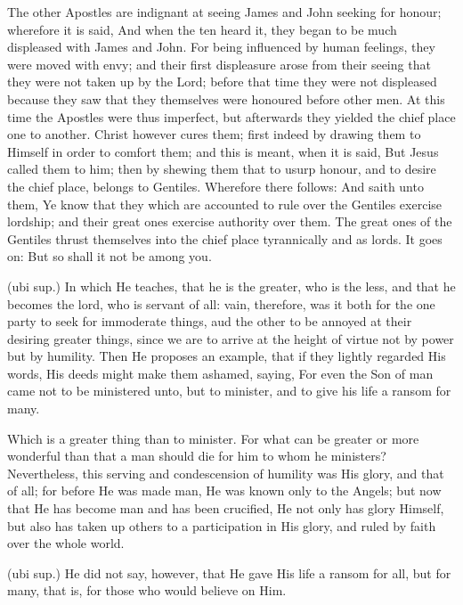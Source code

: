  The other Apostles are indignant at seeing James and John seeking for honour; wherefore it is said, And when the ten heard it, they began to be much displeased with James and John. For being influenced by human feelings, they were moved with envy; and their first displeasure arose from their seeing that they were not taken up by the Lord; before that time they were not displeased because they saw that they themselves were honoured before other men. At this time the Apostles were thus imperfect, but afterwards they yielded the chief place one to another. Christ however cures them; first indeed by drawing them to Himself in order to comfort them; and this is meant, when it is said, But Jesus called them to him; then by shewing them that to usurp honour, and to desire the chief place, belongs to Gentiles. Wherefore there follows: And saith unto them, Ye know that they which are accounted to rule over the Gentiles exercise lordship; and their great ones exercise authority over them. The great ones of the Gentiles thrust themselves into the chief place tyrannically and as lords. It goes on: But so shall it not be among you.

 (ubi sup.) In which He teaches, that he is the greater, who is the less, and that he becomes the lord, who is servant of all: vain, therefore, was it both for the one party to seek for immoderate things, aud the other to be annoyed at their desiring greater things, since we are to arrive at the height of virtue not by power but by humility. Then He proposes an example, that if they lightly regarded His words, His deeds might make them ashamed, saying, For even the Son of man came not to be ministered unto, but to minister, and to give his life a ransom for many.

 Which is a greater thing than to minister. For what can be greater or more wonderful than that a man should die for him to whom he ministers? Nevertheless, this serving and condescension of humility was His glory, and that of all; for before He was made man, He was known only to the Angels; but now that He has become man and has been crucified, He not only has glory Himself, but also has taken up others to a participation in His glory, and ruled by faith over the whole world.

 (ubi sup.) He did not say, however, that He gave His life a ransom for all, but for many, that is, for those who would believe on Him.

